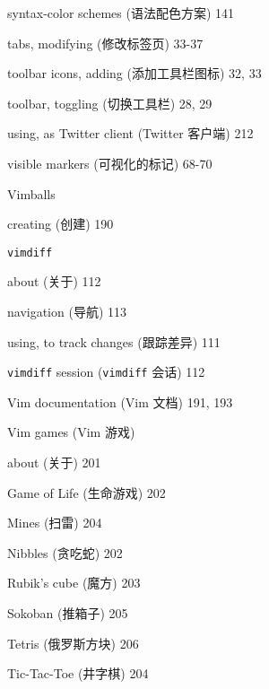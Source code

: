 \begin{multicols}{2}
\hangindent=2pc \quad syntax-color schemes (语法配色方案) 141 \par
\hangindent=2pc \quad tabs, modifying (修改标签页) 33-37 \par
\hangindent=2pc \quad toolbar icons, adding (添加工具栏图标) 32, 33 \par
\hangindent=2pc \quad toolbar, toggling (切换工具栏) 28, 29 \par
\hangindent=2pc \quad using, as Twitter client (Twitter 客户端) 212 \par
\hangindent=2pc \quad visible markers (可视化的标记) 68-70 \par

\hangindent=2pc  Vimballs \par
\hangindent=2pc \quad creating (创建) 190 \par

\hangindent=2pc  \texttt{vimdiff} \par
\hangindent=2pc \quad about (关于) 112 \par
\hangindent=2pc \quad navigation (导航) 113 \par
\hangindent=2pc \quad using, to track changes (跟踪差异) 111 \par

\hangindent=2pc  \texttt{vimdiff} session (\texttt{vimdiff} 会话) 112

\hangindent=2pc  Vim documentation (Vim 文档) 191, 193

\hangindent=2pc  Vim games (Vim 游戏) \par
\hangindent=2pc \quad about (关于) 201 \par
\hangindent=2pc \quad Game of Life (生命游戏) 202 \par
\hangindent=2pc \quad Mines (扫雷) 204 \par
\hangindent=2pc \quad Nibbles (贪吃蛇) 202 \par
\hangindent=2pc \quad Rubik's cube (魔方) 203 \par
\hangindent=2pc \quad Sokoban (推箱子) 205 \par
\hangindent=2pc \quad Tetris (俄罗斯方块) 206 \par
\hangindent=2pc \quad Tic-Tac-Toe (井字棋) 204 \par


\end{multicols}
